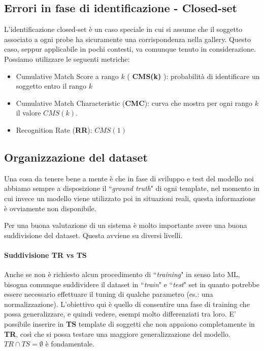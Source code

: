 \documentclass{article}
\begin{document}
\subsection{Errori in fase di identificazione - Closed-set}
L'identificazione closed-set è un caso speciale in cui si assume che il soggetto associato a ogni probe ha sicuramente una corrispondenza nella gallery. Questo caso, seppur applicabile in pochi contesti, va comunque tenuto in considerazione. Possiamo utilizzare le seguenti metriche:
\begin{itemize}
    \item Cumulative Match Score a rango $k$ ( \textbf{CMS(k)} ): probabilità di identificare un soggetto entro il rango $k$
    \item Cumulative Match Characteristic (\textbf{CMC}): curva che mostra per ogni rango $k$ il valore $CMS(k)$.
    \item Recognition Rate (\textbf{RR}): $CMS(1)$
\end{itemize}

\subsection{Organizzazione del dataset}
Una cosa da tenere bene a mente è che in fase di sviluppo e test del modello noi abbiamo sempre a disposizione il ``\textit{ground truth}" di ogni template, nel momento in cui invece un modello viene utilizzato poi in situazioni reali, questa informazione è ovviamente non disponibile.

\bigskip
Per una buona valutazione di un sistema è molto importante avere una buona suddivisione del dataset. Questa avviene su diversi livelli.

\paragraph{Suddivisione TR vs TS} Anche se non è richiesto alcun procedimento di ``\textit{training}" in senso lato ML, bisogna comunque suddividere il dataset in ``\textit{train}" e ``\textit{test}" set in quanto potrebbe essere necessario effettuare il tuning di qualche parametro (es.: una normalizzazione). L'obiettivo qui è quello di consentire una fase di training che possa generalizzare, e quindi vedere, esempi molto differenziati tra loro. E' possibile inserire in \textbf{TS} template di soggetti che non appaiono completamente in \textbf{TR}, così che si possa testare una maggiore generalizzazione del modello. $TR \cap TS = \emptyset$ è fondamentale.
\end{document}
